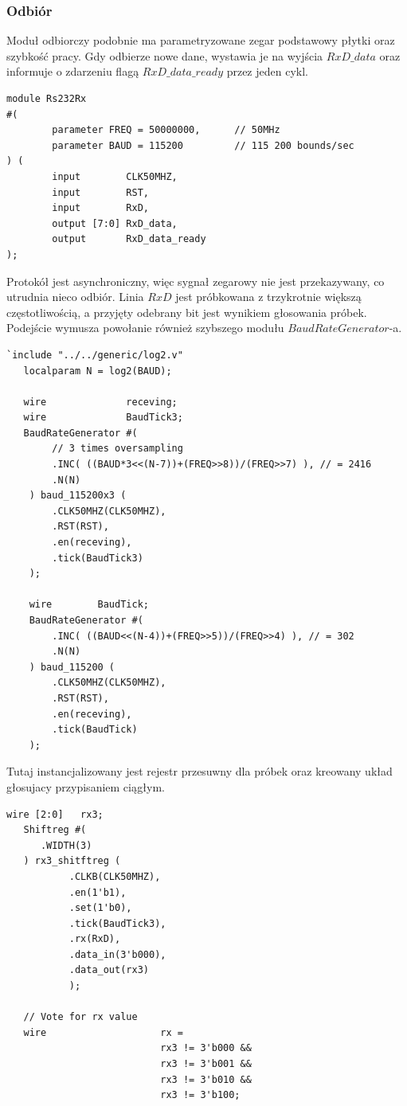 \documentclass[a4paper,12pt]{article}
\begin{document}
\subsubsection{Odbiór}
Moduł odbiorczy podobnie ma parametryzowane zegar podstawowy płytki oraz szybkość pracy. Gdy odbierze nowe dane, wystawia je na wyjścia $RxD\_data$ oraz informuje o zdarzeniu flagą $RxD\_data\_ready$ przez jeden cykl.
\begin{lstlisting}[label=Rs232Rx,caption=Rs232Rx.v]
module Rs232Rx
#(
        parameter FREQ = 50000000,      // 50MHz
        parameter BAUD = 115200         // 115 200 bounds/sec
) (
        input        CLK50MHZ,
        input        RST,
        input        RxD,
        output [7:0] RxD_data,
        output       RxD_data_ready
);
\end{lstlisting}

Protokół jest asynchroniczny, więc sygnał zegarowy nie jest przekazywany, co utrudnia nieco odbiór. Linia $RxD$ jest próbkowana z trzykrotnie większą częstotliwością, a przyjęty odebrany bit jest wynikiem głosowania próbek. Podejście wymusza powołanie również szybszego modułu $BaudRateGenerator$-a.
\begin{lstlisting}[label=Rs232Rx,caption=Rs232Rx.v,firstnumber=13]
   `include "../../generic/log2.v"
   localparam N = log2(BAUD);

   wire              receving;
   wire              BaudTick3;
   BaudRateGenerator #(
        // 3 times oversampling
        .INC( ((BAUD*3<<(N-7))+(FREQ>>8))/(FREQ>>7) ), // = 2416
        .N(N)
    ) baud_115200x3 (
        .CLK50MHZ(CLK50MHZ),
        .RST(RST),
        .en(receving),
        .tick(BaudTick3)
    );

    wire        BaudTick;
    BaudRateGenerator #(
        .INC( ((BAUD<<(N-4))+(FREQ>>5))/(FREQ>>4) ), // = 302
        .N(N)
    ) baud_115200 (
        .CLK50MHZ(CLK50MHZ),
        .RST(RST),
        .en(receving),
        .tick(BaudTick)
    );
\end{lstlisting}

Tutaj instancjalizowany jest rejestr przesuwny dla próbek oraz kreowany układ głosujacy przypisaniem ciągłym.
\begin{lstlisting}[label=Rs232Rx,caption=Rs232Rx.v,firstnumber=40]
   wire [2:0]   rx3;
   Shiftreg #(
      .WIDTH(3)
   ) rx3_shitftreg (
           .CLKB(CLK50MHZ),
           .en(1'b1),
           .set(1'b0),
           .tick(BaudTick3),
           .rx(RxD),
           .data_in(3'b000),
           .data_out(rx3)
           );

   // Vote for rx value
   wire                    rx =
                           rx3 != 3'b000 &&
                           rx3 != 3'b001 &&
                           rx3 != 3'b010 &&
                           rx3 != 3'b100;
\end{lstlisting}
\end{document}
